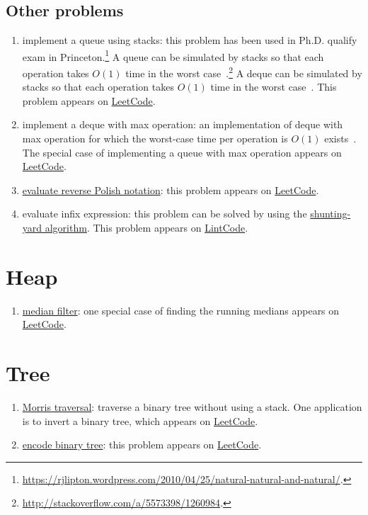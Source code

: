 \subsection{Other problems}
\begin{enumerate}
\item implement a queue using stacks: this problem has been used in Ph.D. qualify exam in Princeton.\footnote{\url{https://rjlipton.wordpress.com/2010/04/25/natural-natural-and-natural/}.} A queue can be simulated by stacks so that each operation takes $O(1)$ time in the worst case~\cite{Hood1981}.\footnote{\url{http://stackoverflow.com/a/5573398/1260984}.} A deque can be simulated by stacks so that each operation takes $O(1)$ time in the worst case~\cite{Chuang1993}. This problem appears on \href{https://leetcode.com/problems/implement-queue-using-stacks/}{LeetCode}.
\item implement a deque with max operation: an implementation of deque with max operation for which the worst-case time per operation is $O(1)$ exists~\cite{Gajewska1986}. The special case of implementing a queue with max operation appears on \href{https://leetcode.com/problems/sliding-window-maximum/}{LeetCode}.
\item \href{https://en.wikipedia.org/wiki/Reverse_Polish_notation#Postfix_algorithm}{evaluate reverse Polish notation}: this problem appears on \href{https://leetcode.com/problems/evaluate-reverse-polish-notation/}{LeetCode}.
\item evaluate infix expression: this problem can be solved by using the \href{https://en.wikipedia.org/wiki/Shunting-yard_algorithm}{shunting-yard algorithm}. This problem appears on \href{http://www.lintcode.com/en/problem/expression-evaluation/}{LintCode}.
\end{enumerate}

\section{Heap}
\begin{enumerate}
\item \href{https://en.wikipedia.org/wiki/Median_filter}{median filter}: one special case of finding the running medians appears on \href{https://leetcode.com/problems/find-median-from-data-stream/}{LeetCode}.
\end{enumerate}

\section{Tree}
\begin{enumerate}
\item \href{https://en.wikipedia.org/wiki/Tree_traversal#Morris_in-order_traversal_using_threading}{Morris traversal}: traverse a binary tree without using a stack. One application is to invert a binary tree, which appears on \href{https://leetcode.com/problems/invert-binary-tree/}{LeetCode}.
\item \href{https://en.wikipedia.org/wiki/Binary_tree#Encodings}{encode binary tree}: this problem appears on \href{https://leetcode.com/problems/serialize-and-deserialize-binary-tree/}{LeetCode}.
\end{enumerate}

